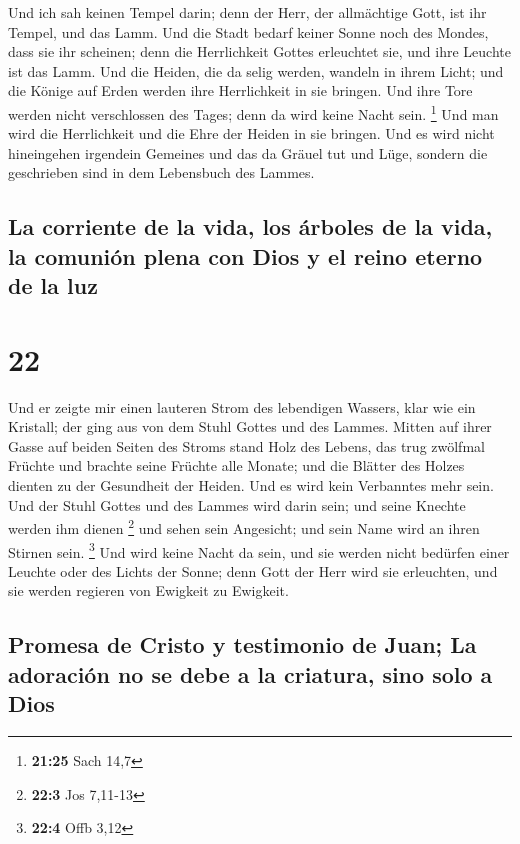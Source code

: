  Und ich sah keinen Tempel darin; denn der Herr, der
allmächtige Gott, ist ihr Tempel, und das Lamm.  Und die
Stadt bedarf keiner Sonne noch des Mondes, dass sie ihr scheinen; denn
die Herrlichkeit Gottes erleuchtet sie, und ihre Leuchte ist das Lamm.
 Und die Heiden, die da selig werden, wandeln in ihrem
Licht; und die Könige auf Erden werden ihre Herrlichkeit in sie bringen.
 Und ihre Tore werden nicht verschlossen des Tages; denn
da wird keine Nacht sein. \footnote{\textbf{21:25} Sach 14,7}
 Und man wird die Herrlichkeit und die Ehre der Heiden in
sie bringen.  Und es wird nicht hineingehen irgendein
Gemeines und das da Gräuel tut und Lüge, sondern die geschrieben sind in
dem Lebensbuch des Lammes.

\hypertarget{la-corriente-de-la-vida-los-uxe1rboles-de-la-vida-la-comuniuxf3n-plena-con-dios-y-el-reino-eterno-de-la-luz}{%
\subsection{La corriente de la vida, los árboles de la vida, la comunión
plena con Dios y el reino eterno de la
luz}\label{la-corriente-de-la-vida-los-uxe1rboles-de-la-vida-la-comuniuxf3n-plena-con-dios-y-el-reino-eterno-de-la-luz}}

\hypertarget{section-21}{%
\section{22}\label{section-21}}

 Und er zeigte mir einen lauteren Strom des lebendigen
Wassers, klar wie ein Kristall; der ging aus von dem Stuhl Gottes und
des Lammes.  Mitten auf ihrer Gasse auf beiden Seiten des
Stroms stand Holz des Lebens, das trug zwölfmal Früchte und brachte
seine Früchte alle Monate; und die Blätter des Holzes dienten zu der
Gesundheit der Heiden.  Und es wird kein Verbanntes mehr
sein. Und der Stuhl Gottes und des Lammes wird darin sein; und seine
Knechte werden ihm dienen \footnote{\textbf{22:3} Jos 7,11-13}
 und sehen sein Angesicht; und sein Name wird an ihren
Stirnen sein. \footnote{\textbf{22:4} Offb 3,12}  Und wird
keine Nacht da sein, und sie werden nicht bedürfen einer Leuchte oder
des Lichts der Sonne; denn Gott der Herr wird sie erleuchten, und sie
werden regieren von Ewigkeit zu Ewigkeit.

\hypertarget{promesa-de-cristo-y-testimonio-de-juan-la-adoraciuxf3n-no-se-debe-a-la-criatura-sino-solo-a-dios}{%
\subsection{Promesa de Cristo y testimonio de Juan; La adoración no se
debe a la criatura, sino solo a
Dios}\label{promesa-de-cristo-y-testimonio-de-juan-la-adoraciuxf3n-no-se-debe-a-la-criatura-sino-solo-a-dios}}

